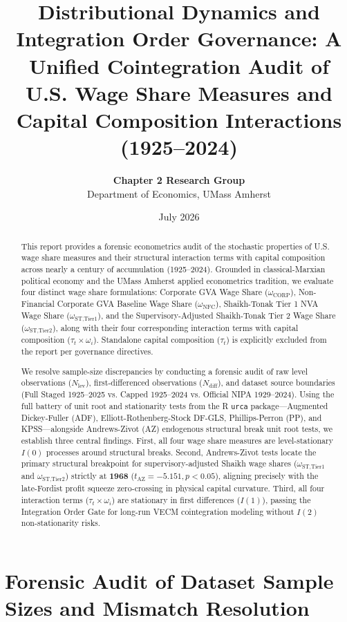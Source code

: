 \documentclass[11pt,a4paper]{article}
\title{\textbf{Distributional Dynamics and Integration Order Governance: A Unified Cointegration Audit of U.S. Wage Share Measures and Capital Composition Interactions (1925--2024)}}
\author{\textbf{Chapter 2 Research Group} \\ Department of Economics, UMass Amherst}
\date{July 2026}
\begin{document}
\maketitle

\begin{abstract}
This report provides a forensic econometrics audit of the stochastic properties of U.S. wage share measures and their structural interaction terms with capital composition across nearly a century of accumulation (1925--2024). Grounded in classical-Marxian political economy and the UMass Amherst applied econometrics tradition, we evaluate four distinct wage share formulations: Corporate GVA Wage Share ($\omega_{\text{CORP}}$), Non-Financial Corporate GVA Baseline Wage Share ($\omega_{\text{NFC}}$), Shaikh-Tonak Tier 1 NVA Wage Share ($\omega_{\text{ST,Tier1}}$), and the Supervisory-Adjusted Shaikh-Tonak Tier 2 Wage Share ($\omega_{\text{ST,Tier2}}$), along with their four corresponding interaction terms with capital composition ($\tau_t \times \omega_i$). Standalone capital composition ($\tau_t$) is explicitly excluded from the report per governance directives.

We resolve sample-size discrepancies by conducting a forensic audit of raw level observations ($N_{\text{lev}}$), first-differenced observations ($N_{\text{diff}}$), and dataset source boundaries (Full Staged 1925--2025 vs. Capped 1925--2024 vs. Official NIPA 1929--2024). Using the full battery of unit root and stationarity tests from the R \texttt{urca} package---Augmented Dickey-Fuller (ADF), Elliott-Rothenberg-Stock DF-GLS, Phillips-Perron (PP), and KPSS---alongside Andrews-Zivot (AZ) endogenous structural break unit root tests, we establish three central findings. First, all four wage share measures are level-stationary $I(0)$ processes around structural breaks. Second, Andrews-Zivot tests locate the primary structural breakpoint for supervisory-adjusted Shaikh wage shares ($\omega_{\text{ST,Tier1}}$ and $\omega_{\text{ST,Tier2}}$) strictly at \textbf{1968} ($t_{\text{AZ}} = -5.151, p < 0.05$), aligning precisely with the late-Fordist profit squeeze zero-crossing in physical capital curvature. Third, all four interaction terms ($\tau_t \times \omega_i$) are stationary in first differences ($I(1)$), passing the Integration Order Gate for long-run VECM cointegration modeling without $I(2)$ non-stationarity risks.
\end{abstract}

\FloatBarrier
\section{Forensic Audit of Dataset Sample Sizes and Mismatch Resolution}
\end{document}
